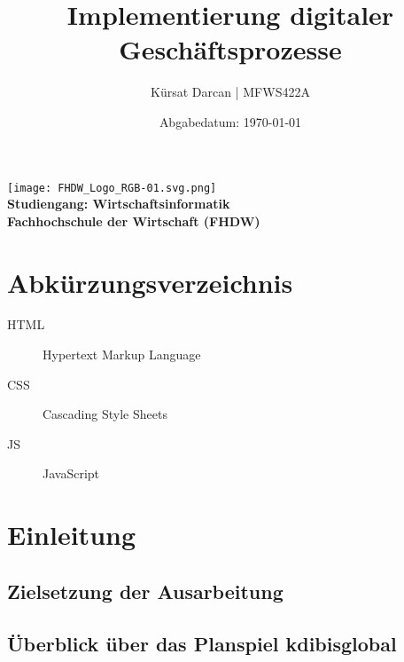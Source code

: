 \documentclass[a4paper,12pt]{article}
\title{\textbf{Implementierung digitaler Geschäftsprozesse}}
\author{Kürsat Darcan | MFWS422A}
\date{Abgabedatum: \today}
\begin{document}
\maketitle
\thispagestyle{empty}
\vspace{2cm}
\begin{center}
    \texttt{[image: FHDW\_Logo\_RGB-01.svg.png]} %
    \\
    \vspace{1cm}
    \textbf{Studiengang: Wirtschaftsinformatik}\\
    \textbf{Fachhochschule der Wirtschaft (FHDW)}
\end{center}
\newpage

\renewcommand{\thepage}{\roman{page}} %
\tableofcontents
\newpage

\listoffigures
{}
\newpage

\listoftables
{}
\newpage

\section*{Abkürzungsverzeichnis}
\begin{description}
    \item[HTML] Hypertext Markup Language
    \item[CSS] Cascading Style Sheets
    \item[JS] JavaScript
\end{description}
\newpage

\renewcommand{\thepage}{\arabic{page}} %
\setcounter{page}{1}


\section{Einleitung}
\subsection{Zielsetzung der Ausarbeitung}
\subsection{Überblick über das Planspiel kdibisglobal}
\end{document}
